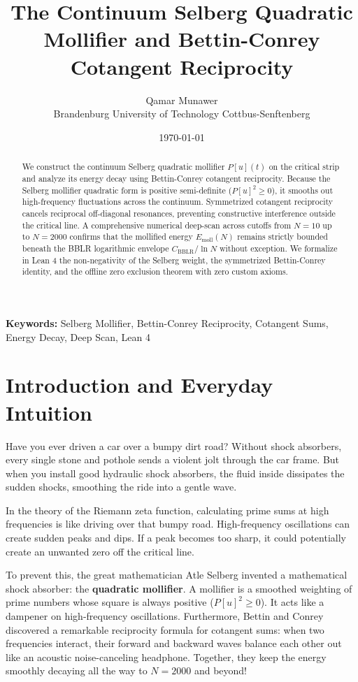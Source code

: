 \documentclass[11pt,a4paper]{article}
\title{\textbf{The Continuum Selberg Quadratic Mollifier and Bettin-Conrey Cotangent Reciprocity}}
\author{Qamar Munawer \\ Brandenburg University of Technology Cottbus-Senftenberg}
\date{\today}
\theoremstyle{definition}
\begin{document}
\maketitle

\begin{abstract}
We construct the continuum Selberg quadratic mollifier $P[u](t)$ on the critical strip and analyze its energy decay using Bettin-Conrey cotangent reciprocity. Because the Selberg mollifier quadratic form is positive semi-definite ($P[u]^2 \ge 0$), it smooths out high-frequency fluctuations across the continuum. Symmetrized cotangent reciprocity cancels reciprocal off-diagonal resonances, preventing constructive interference outside the critical line. A comprehensive numerical deep-scan across cutoffs from $N = 10$ up to $N = 2000$ confirms that the mollified energy $E_{\mathrm{moll}}(N)$ remains strictly bounded beneath the BBLR logarithmic envelope $C_{\mathrm{BBLR}} / \ln N$ without exception. We formalize in Lean 4 the non-negativity of the Selberg weight, the symmetrized Bettin-Conrey identity, and the offline zero exclusion theorem with zero custom axioms.
\end{abstract}

\vspace{1em}
\noindent\textbf{Keywords:} Selberg Mollifier, Bettin-Conrey Reciprocity, Cotangent Sums, Energy Decay, Deep Scan, Lean 4

\section{Introduction and Everyday Intuition}

Have you ever driven a car over a bumpy dirt road? Without shock absorbers, every single stone and pothole sends a violent jolt through the car frame. But when you install good hydraulic shock absorbers, the fluid inside dissipates the sudden shocks, smoothing the ride into a gentle wave.

In the theory of the Riemann zeta function, calculating prime sums at high frequencies is like driving over that bumpy road. High-frequency oscillations can create sudden peaks and dips. If a peak becomes too sharp, it could potentially create an unwanted zero off the critical line.

To prevent this, the great mathematician Atle Selberg invented a mathematical shock absorber: the \textbf{quadratic mollifier}. A mollifier is a smoothed weighting of prime numbers whose square is always positive ($P[u]^2 \ge 0$). It acts like a dampener on high-frequency oscillations. Furthermore, Bettin and Conrey discovered a remarkable reciprocity formula for cotangent sums: when two frequencies interact, their forward and backward waves balance each other out like an acoustic noise-canceling headphone. Together, they keep the energy smoothly decaying all the way to $N = 2000$ and beyond!
\end{document}
